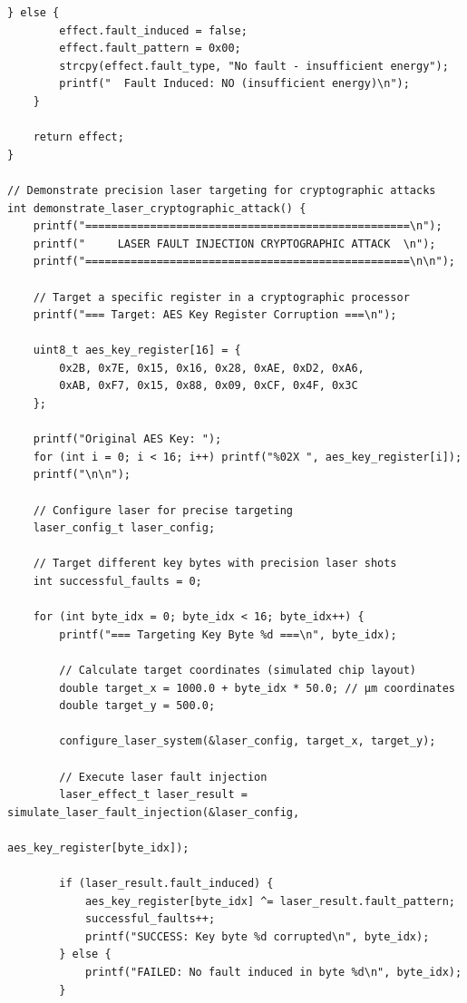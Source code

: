 \documentclass[12pt,a4paper]{article}
\begin{document}
\begin{lstlisting}[caption={Laser Fault Injection Control System}]
    } else {
        effect.fault_induced = false;
        effect.fault_pattern = 0x00;
        strcpy(effect.fault_type, "No fault - insufficient energy");
        printf("  Fault Induced: NO (insufficient energy)\n");
    }
    
    return effect;
}

// Demonstrate precision laser targeting for cryptographic attacks
int demonstrate_laser_cryptographic_attack() {
    printf("==================================================\n");
    printf("     LASER FAULT INJECTION CRYPTOGRAPHIC ATTACK  \n");
    printf("==================================================\n\n");
    
    // Target a specific register in a cryptographic processor
    printf("=== Target: AES Key Register Corruption ===\n");
    
    uint8_t aes_key_register[16] = {
        0x2B, 0x7E, 0x15, 0x16, 0x28, 0xAE, 0xD2, 0xA6,
        0xAB, 0xF7, 0x15, 0x88, 0x09, 0xCF, 0x4F, 0x3C
    };
    
    printf("Original AES Key: ");
    for (int i = 0; i < 16; i++) printf("%02X ", aes_key_register[i]);
    printf("\n\n");
    
    // Configure laser for precise targeting
    laser_config_t laser_config;
    
    // Target different key bytes with precision laser shots
    int successful_faults = 0;
    
    for (int byte_idx = 0; byte_idx < 16; byte_idx++) {
        printf("=== Targeting Key Byte %d ===\n", byte_idx);
        
        // Calculate target coordinates (simulated chip layout)
        double target_x = 1000.0 + byte_idx * 50.0; // μm coordinates
        double target_y = 500.0;
        
        configure_laser_system(&laser_config, target_x, target_y);
        
        // Execute laser fault injection
        laser_effect_t laser_result = simulate_laser_fault_injection(&laser_config,
                                                                   aes_key_register[byte_idx]);
        
        if (laser_result.fault_induced) {
            aes_key_register[byte_idx] ^= laser_result.fault_pattern;
            successful_faults++;
            printf("SUCCESS: Key byte %d corrupted\n", byte_idx);
        } else {
            printf("FAILED: No fault induced in byte %d\n", byte_idx);
        }
        

\end{lstlisting}
\end{document}
